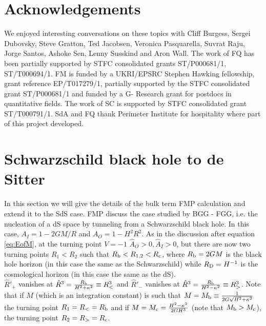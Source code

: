 \documentclass[a4paper,11pt]{article}
\numberwithin{equation}{section}
\newcommand{\citep}{\cite}
\numberwithin{equation}{section}
\begin{document}
\section*{Acknowledgements}
We enjoyed interesting conversations on these topics with Cliff Burgess, Sergei Dubovsky, Steve Gratton, Ted Jacobsen, Veronica Pasquarella, Suvrat Raju, Jorge Santos, Ashoke Sen, Lenny Susskind and Aron Wall.  The work of FQ has been partially supported by STFC consolidated grants ST/P000681/1, ST/T000694/1. FM is funded by a UKRI/EPSRC Stephen Hawking fellowship, grant reference EP/T017279/1, partially supported by the STFC consolidated grant ST/P000681/1 and funded by a G- Research grant for postdocs in quantitative fields.  The work of SC is  supported by STFC consolidated grant ST/T000791/1. SdA and FQ thank Perimeter Institute for hospitality where part of this project developed.

\appendix
\label{sec:Appendix}


\section{Schwarzschild black hole to de Sitter\label{sec:stods}}


In this section we will give the details of the bulk term FMP calculation and  extend it to the SdS case. FMP discuss the case studied by BGG - FGG\citep{Blau:1986cw,Farhi:1989yr}, i.e. the nucleation of a dS
space by tunneling from a Schwarzschild black hole. In this case, $A_{I}=1-2GM/R$ and $A_{O}=1-H^{2}R^{2}$. As in the discussion
after equation \eqref{eq:EofM}, at the turning point $V=-1$ $\hat{A}_{O}>0,\hat{A}_{I}>0$, but there are now two turning points $R_{1}<R_{2}$ such that $R_{{\rm b}}<R_{1,2}<R_{{\rm c}}$, where $R_{{\rm b}}=2GM$ is the black hole horizon (in this case the same as the Schwarzschild) while $R_{{\rm D}}=H^{-1}$ is the cosmological horizon (in this case the same as the dS).\\

$\hat R'_{+}$ vanishes at $\hat{R}^{3}=\frac{R_{{\rm b}}}{H^{2}+\kappa^{2}}\equiv R_{<}^{3}$
and $\hat R'_{-}$ vanishes at $\hat{R}^{3}=\frac{R_{{\rm b}}}{H^{2}-\kappa^{2}}\equiv R_{>}^{3}$. Note that if $M$ (which is an integration constant) is such that $M = M_{{\rm b}}\equiv\frac{1}{2G\sqrt{H^{2}+\kappa^{2}}}$ the turning point $R_{1}=R_{<}=R_{{\rm b}}$ and if $M=M_{{\rm c}}=\frac{H^{2}-\kappa^{2}}{2GH^{3}}$
(note that $M_{{\rm b}}>M_{{\rm c}}$), the turning point $R_{2}=R_{>}=R_{{\rm c}}$. 
\end{document}
